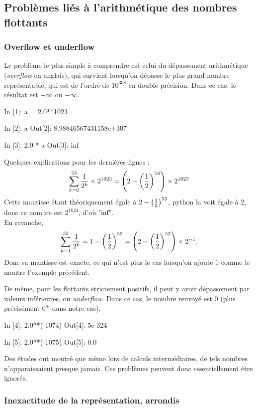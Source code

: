 \documentclass{magnolia}
\begin{document}
    
  

\subsection{Problèmes liés à l'arithmétique des nombres flottants}

\subsubsection{Overflow et underflow}
Le problème le plus simple à comprendre est celui du dépassement arithmétique (\emph{overflow} en anglais), qui
survient lorsqu'on dépasse le plus grand nombre représentable, qui est de l'ordre
de $10^{308}$ en double précision. Dans ce cas, le résultat est
$+\infty$ ou $-\infty$.

\begin{pythoncode}
In [1]: a = 2.0**1023

In [2]: a
Out[2]: 8.98846567431158e+307

In [3]: 2.0 * a
Out[3]: inf
\end{pythoncode}

\begin{sol}
Quelques explications pour les dernières lignes :
$$\sum_{k=0}^{53}\frac{1}{2^k}\times 2^{1023}=\left(2-\left(\frac{1}{2}\right)^{53}\right)\times 2^{1023}$$ Cette mantisse étant théoriquement égale à $2-\left(\frac{1}{2}\right)^{53}$, python la voit égale à $2$, donc ce nombre est $2^{1024}$, d'où "inf".\\
En revanche, 
$$\sum_{k=1}^{53}\frac{1}{2^k}=1-\left(\frac{1}{2}\right)^{53}=\left(2-\left(\frac{1}{2}\right)^{52}\right)\times 2^{-1}.$$ Donc sa mantisse est exacte, ce qui n'est plus le cas lorsqu'on ajoute $1$ comme le montre l'exemple précédent.
\end{sol}

\noindent
De même, pour les flottants strictement positifs, il peut y avoir dépassement par valeurs inférieures, ou \textit{underflow}. Dans
ce cas, le nombre renvoyé est 0 (plus précisément $0^+$ dans notre cas).

\begin{pythoncode}
In [4]: 2.0**(-1074)
Out[4]: 5e-324

In [5]: 2.0**(-1075)
Out[5]: 0.0
\end{pythoncode}
\noindent
Des études ont montré que même lors de calculs intermédiaires, de tels nombres
n'apparaissaient presque jamais. Ces problèmes peuvent donc essentiellement être ignorés.

\subsubsection{Inexactitude de la représentation, arrondis}
\end{document}
